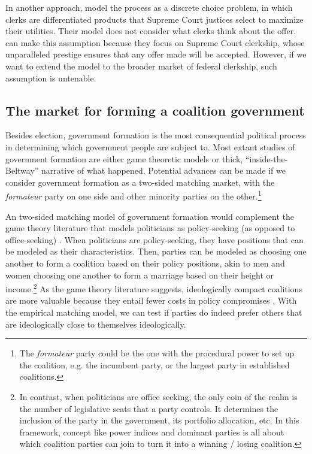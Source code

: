 In another approach, \citet{Rozema2016} model the process as a discrete choice problem, in which clerks are
differentiated products that Supreme Court justices select to
maximize their utilities. Their model does not consider what clerks think about
the offer. \citet{Rozema2016} can make this assumption because they focus on
Supreme Court clerkship, whose unparalleled prestige ensures that any offer made
will be accepted. However, if we want to extend the model to the
broader market of federal clerkship, such assumption is untenable.

\subsection{The market for forming a coalition government}

Besides election, government formation is the most consequential
political process in determining which government people are subject to. Most
extant studies of government formation are either game theoretic models or thick, ``inside-the-Beltway''
narrative of what happened. Potential advances can be made if we consider
government formation as a two-sided matching market, with the \textit{formateur} party
on one side and other minority parties on the other.\footnote{The
  \textit{formateur} party could be the one with the procedural power to set up
  the coalition, e.g. the incumbent party, or the largest party in established
  coalitions.}

An two-sided matching model of government formation would complement the game theory literature that models politicians as policy-seeking (as
opposed to office-seeking) \citep{Laver1998}. When politicians are policy-seeking, they have
positions that can be modeled as their characteristics. Then, parties can be
modeled as choosing one
another to form a coalition based on their policy positions, akin to men and women
choosing one another to form a marriage based on their height or income.\footnote{In
  contrast, when politicians are office seeking, the only coin of the realm is the number of legislative seats that a
party controls. It determines the inclusion of the party in the government, its portfolio
allocation, etc. In this framework, concept like power indices and dominant
parties is all about which coalition parties can join to turn it into a winning /
losing coalition.} As the game theory literature suggests, ideologically compact
coalitions are more valuable because they entail fewer costs in policy
compromises \citep{DeSwaan1973}. With the empirical matching model, we can test if parties do indeed
prefer others that are ideologically close to themselves ideologically.

